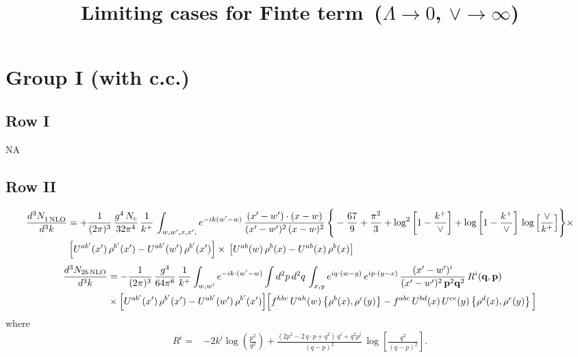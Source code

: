 \documentclass[9pt]{article}
\title{Limiting cases for Finte term\, ($\Lambda\to 0$, $\vee\to \infty$)}
\author{}
\date{}
\numberwithin{equation}{section}
\begin{document}
\maketitle
\section{Group I (with c.c.)}
\subsection{Row I}
\textsc{NA}
\subsection{Row II}
\begin{align}
     \frac{d^{3}N_{1\,\rm NLO}^{\rm}}{d^{3}k} &  =  +\frac{1}{(2\pi)^{3}}\, \frac{g^{4}\,N_{c}}{32\pi^{4}}\,\frac{1}{k^{+}}\, \int_{w, w',x,x',} e^{-ik(w^\prime-w)}\, \frac{(x'-w')\cdot (x-w)}{(x'-w')^{2}\, (x-w)^{2}}\, \Bigg\{ -\frac{67}{9}+\frac{\pi^{2}}{3}+\log^{2}{\left[1-\frac{k^{+}}{\vee}\right]}+\log{\left[1-\frac{k^{+}}{\vee}\right]}\,\log{\left[\frac{\vee}{k^{+}}\right]}\Bigg\}\times\notag \\ & \left[U^{ab'}(x')\,\rho^{b'}(x') - U^{ab'}(w')\,\rho^{b'}(x')\right]\times\,\left[U^{ab}(w)\,\rho^{b}(x) - U^{ab}(x)\,\rho^{b}(x)\right]
\end{align}  
\begin{align}
\frac{d^{3}N_{2b\,\rm NLO}}{d^{3}k} & = -\frac{1}{(2\pi)^{3}}\,\frac{g^{4}}{64\pi^{6}}\,\frac{1}{k^{+}}\int_{w,w'} e^{-ik\cdot(w'-w)}
\int d^{2}p\,d^{2}q\,\int_{x,y} e^{iq\cdot(w-y)}\,e^{ip\cdot(y-x)}\,\frac{(x'-w')^{i}}{(x'-w')^{2}\,\mathbf{p}^{2}\mathbf{q}^{2}}\,R^{i}(\mathbf{q},\mathbf{p})\notag\\ &\times\Big[U^{ab'}(x')\,\rho^{b'}(x')-U^{ab'}(w')\,\rho^{b'}(x')\Big]
\Big[f^{hbc}\,U^{ah}(w)\left\{\rho^{b}(x),\rho^{c}(y)\right\}-f^{abc}\,U^{bd}(x)\,U^{ce}(y)\left\{\rho^{d}(x),\rho^{e}(y)\right\}\Big]
\end{align}
where
\begin{align}
R^{i} =& -2k^{i}\log\left(\frac{p^{2}}{q^{2}}\right)
+\frac{(2p^{2}-2\,q\cdot p+q^{2})\,q^{i}+q^{2}p^{i}}{(q-p)^{2}}\,
\log\left[\frac{q^{2}}{(q-p)^{2}}\right].
\end{align}
\end{document}
